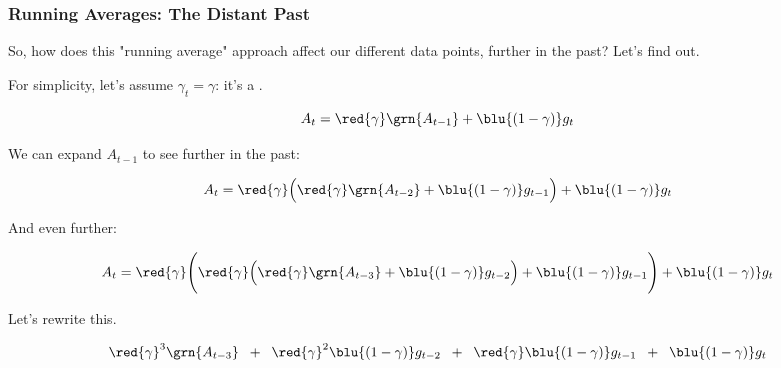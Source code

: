         \subsubsection{Running Averages: The Distant Past}

            So, how does this "running average" approach affect our different data points, further in the past? Let's find out.

            \subsecdiv

            For simplicity, let's assume $\gamma_t=\gamma$: it's a .

            \begin{equation}
                A_t 
                =
                \red{\gamma} \grn{A_{t-1}}
                + 
                \blu{(1-\gamma)} g_{t}
            \end{equation}

            We can expand $A_{t-1}$ to see further in the past:

            \begin{equation}
                A_t 
                =
                \red{\gamma} 
                    \Big(\red{\gamma} \grn{A_{t-2}}
                    + 
                    \blu{(1-\gamma)} g_{t-1}
                \Big)
                + 
                \blu{(1-\gamma)} g_{t}
            \end{equation}

            And even further: 
            

            \begin{equation}
                A_t 
                =
                \red{\gamma} 
                \Bigg(\red{\gamma} 
                    \Big(
                        \red{\gamma} \grn{A_{t-3}}
                        + 
                        \blu{(1-\gamma)} g_{t-2}
                    \Big)
                    + 
                    \blu{(1-\gamma)} g_{t-1}
                \Bigg)
                + 
                \blu{(1-\gamma)} g_{t}
            \end{equation}

            Let's rewrite this.

            \begin{equation}
                \red{\gamma}^3 \grn{A_{t-3}}  \;\;+\;\; 
                \red{\gamma}^2\blu{(1-\gamma)} g_{t-2} \;\;+\;\;
                \red{\gamma}\blu{(1-\gamma)} g_{t-1} \;\;+\;\; 
                \blu{(1-\gamma)} g_{t}
            \end{equation}

